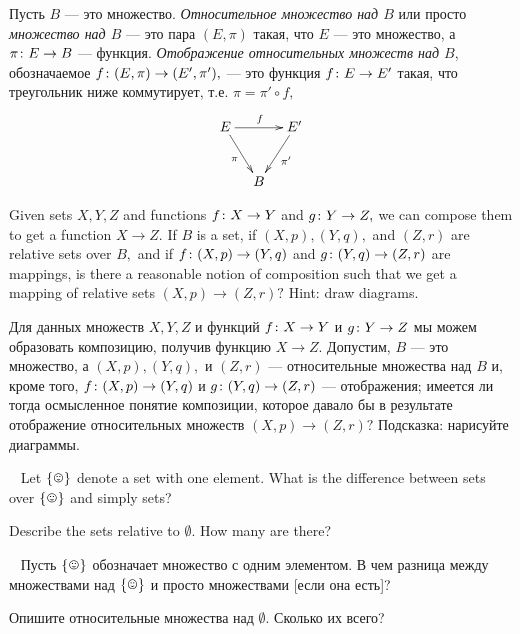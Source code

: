 \documentclass[CT4S-EN-RU]{subfiles}
\begin{document}
\begin{definitionRUS}\label{def:relative sets}
Пусть $B$ — это множество. {\em Относительное множество над $B$} или просто {\em множество над $B$} — это пара $(E,\pi)$ такая, что $E$ — это множество, а $\pi\colon E\rightarrow B$ — функция. {\em Отображение относительных множеств над $B$}, обозначаемое $f\colon (E,\pi)\rightarrow(E',\pi'),$ — это функция $f\colon E\rightarrow E'$ такая, что треугольник ниже коммутирует, т.е. $\pi=\pi'\circ f,$
$$
\xymatrix@=10pt{E\ar[rr]^f\ar[rdd]_{\pi}&&E'\ar[ldd]^{\pi'}\\\\&B
}
$$
\end{definitionRUS}

\begin{exerciseENG}
Given sets $X,Y,Z$ and functions $f\colon X\rightarrow Y$ and $g\colon Y\rightarrow Z,$ we can compose them to get a function $X\to Z.$ If $B$ is a set, if $(X,p), (Y,q),$ and $(Z,r)$ are relative sets over $B,$ and if $f\colon (X,p)\rightarrow (Y,q)$ and $g\colon (Y,q)\rightarrow (Z,r)$ are mappings, is there a reasonable notion of composition such that we get a mapping of relative sets $(X,p)\to (Z,r)?$ Hint: draw diagrams.
\end{exerciseENG}

\begin{exerciseRUS}
Для данных множеств $X,Y,Z$ и функций $f\colon X\rightarrow Y$ и $g\colon Y\rightarrow Z$ мы можем образовать композицию, получив функцию $X\to Z.$ Допустим, $B$ — это множество, а $(X,p), (Y,q),$ и $(Z,r)$ — относительные множества над $B$ и, кроме того, $f\colon (X,p)\rightarrow (Y,q)$ и $g\colon (Y,q)\rightarrow (Z,r)$ — отображения; имеется ли тогда осмысленное понятие композиции, которое давало бы в результате отображение относительных множеств $(X,p)\to (Z,r)?$ Подсказка: нарисуйте диаграммы.
\end{exerciseRUS}

\begin{exerciseENG}~
\sexc Let $\singleton$ denote a set with one element. What is the difference between sets over $\singleton$ and simply sets?
\item Describe the sets relative to $\emptyset.$ How many are there?
\endsexc
\end{exerciseENG}

\begin{exerciseRUS}~
\sexc Пусть $\singleton$ обозначает множество с одним элементом. В чем разница между множествами над $\singleton$ и просто множествами [если она есть]?
\item Опишите относительные множества над $\emptyset.$ Сколько их всего?
\endsexc
\end{exerciseRUS}
\end{document}
